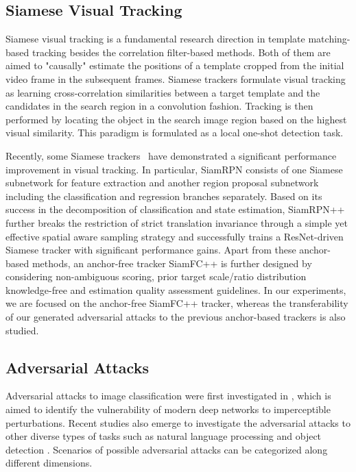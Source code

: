 \documentclass[journal]{IEEEtran}
\begin{document}
\subsection{Siamese Visual Tracking}

Siamese visual tracking is a fundamental research direction in template matching-based tracking besides the correlation filter-based methods. Both of them are aimed to "causally" estimate the positions of a template cropped from the initial video frame in the subsequent frames. Siamese trackers formulate visual tracking as learning cross-correlation similarities between a target template and the candidates in the search region in a convolution fashion. Tracking is then performed by locating the object in the search image region based on the highest visual similarity. This paradigm is formulated as a local one-shot detection task.

Recently, some Siamese trackers~\cite{SiamRPN,SiamRPN++,SiamFC++} have demonstrated a significant performance improvement in visual tracking. 
In particular, SiamRPN \cite{SiamRPN} consists of one Siamese subnetwork for feature extraction and another region proposal subnetwork including the classification and regression branches separately. Based on its success in the decomposition of classification and state estimation, SiamRPN++ \cite{SiamRPN++} further breaks the restriction of strict translation invariance through a simple yet effective spatial aware sampling strategy and successfully trains a ResNet-driven Siamese tracker with significant performance gains. Apart from these anchor-based methods, an anchor-free tracker SiamFC++ \cite{SiamFC++} is further designed by considering non-ambiguous scoring, prior target scale/ratio distribution knowledge-free and estimation quality assessment guidelines.
In our experiments, we are focused on the anchor-free SiamFC++ tracker, whereas the transferability of our generated adversarial attacks to the previous anchor-based trackers is also studied.

\subsection{Adversarial Attacks}

Adversarial attacks to image classification were first investigated in \cite{intriguing}, which is aimed to identify the vulnerability of modern deep networks to imperceptible perturbations. 
Recent studies also emerge to investigate the adversarial attacks to other diverse types of tasks such as natural language processing \cite{generating,zhang2020adversarial,morris2020textattack,jin2020bert} and object detection \cite{wei2019transferable}.
Scenarios of possible adversarial attacks can be categorized along different dimensions.
\end{document}
